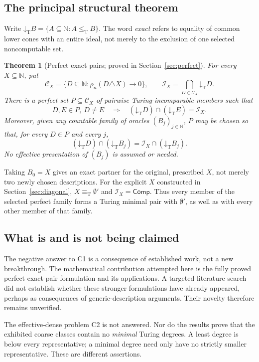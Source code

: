 \documentclass[11pt,a4paper]{article}
\newcommand{\N}{\mathbb N}
\newcommand{\leT}{\leq_{\mathrm T}}
\newcommand{\eqT}{\equiv_{\mathrm T}}
\newcommand{\CD}{\mathcal C}
\newcommand{\core}{\mathcal I}
\newcommand{\Comp}{\mathsf{Comp}}
\newcommand{\low}[1]{\mathord\downarrow_{\!\mathrm T}#1}
\newtheorem{theorem}{Theorem}[section]
\theoremstyle{definition}\newtheorem{definition}[theorem]{Definition}
\theoremstyle{remark}\newtheorem{remark}[theorem]{Remark}
\begin{document}
\subsection{The principal structural theorem}
Write $\low B=\{A\subseteq\N:A\leT B\}$. The word \emph{exact} refers to equality
of common lower cones with an entire ideal, not merely to the exclusion of
one selected noncomputable set.

\begin{theorem}[Perfect exact pairs; proved in Section~\ref{sec:perfect}]
\label{thm:mainpreview}
For every $X\subseteq\N$, put
\[
 \CD_X=\{D\subseteq\N:\rho_n(D\triangle X)\longrightarrow0\},
 \qquad \core_X=\bigcap_{D\in\CD_X}\low D.
\]
There is a perfect set $P\subseteq\CD_X$ of pairwise Turing-incomparable
members such that
\begin{equation}\label{eq:perfect-main}
 D,E\in P,\ D\ne E
 \quad\Longrightarrow\quad
 (\low D)\cap(\low E)=\core_X.
\end{equation}
Moreover, given any countable family of oracles $(B_j)_{j\in\N}$, $P$ may be
chosen so that, for every $D\in P$ and every $j$,
\begin{equation}\label{eq:prescribed-main}
 (\low D)\cap(\low {B_j})=\core_X\cap(\low {B_j}).
\end{equation}
No effective presentation of $(B_j)$ is assumed or needed.
\end{theorem}

Taking $B_0=X$ gives an exact partner for the original, prescribed $X$, not
merely two newly chosen descriptions. For the explicit $X$ constructed in
Section~\ref{sec:diagonal}, $X\eqT\emptyset'$ and $\core_X=\Comp$. Thus every
member of the selected perfect family forms a Turing minimal pair with
$\emptyset'$, as well as with every other member of that family.

\subsection{What is and is not being claimed}
The negative answer to C1 is a consequence of established work, not a new
breakthrough. The mathematical contribution attempted here is the fully
proved perfect exact-pair formulation and its applications. A targeted
literature search did not establish whether these stronger formulations have
already appeared, perhaps as consequences of generic-description arguments.
Their novelty therefore remains unverified.

The effective-dense problem C2 is not answered. Nor do the results prove that
the exhibited coarse classes contain no \emph{minimal} Turing degrees. A least
degree is below every representative; a minimal degree need only have no
strictly smaller representative. These are different assertions.
\end{document}
